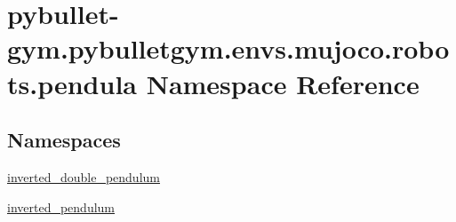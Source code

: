 \hypertarget{namespacepybullet-gym_1_1pybulletgym_1_1envs_1_1mujoco_1_1robots_1_1pendula}{}\section{pybullet-\/gym.pybulletgym.\+envs.\+mujoco.\+robots.\+pendula Namespace Reference}
\label{namespacepybullet-gym_1_1pybulletgym_1_1envs_1_1mujoco_1_1robots_1_1pendula}
\subsection*{Namespaces}
\begin{DoxyCompactItemize}
\item 
 \hyperlink{namespacepybullet-gym_1_1pybulletgym_1_1envs_1_1mujoco_1_1robots_1_1pendula_1_1inverted__double__pendulum}{inverted\+\_\+double\+\_\+pendulum}
\item 
 \hyperlink{namespacepybullet-gym_1_1pybulletgym_1_1envs_1_1mujoco_1_1robots_1_1pendula_1_1inverted__pendulum}{inverted\+\_\+pendulum}
\end{DoxyCompactItemize}
